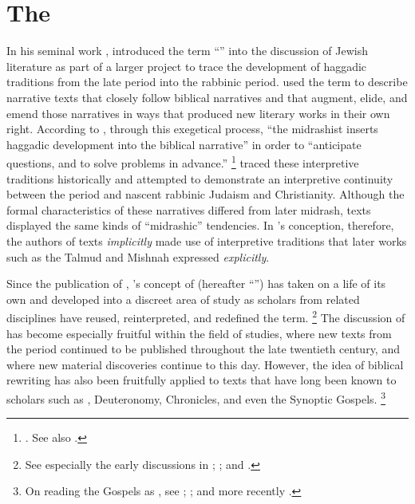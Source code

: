 
\chapter{The \rwb}
\label{chap:rwb}

In his seminal work , \Vermes introduced the term ``\rwB'' into the discussion of \secondtemple Jewish literature as part of a larger project to trace the development of haggadic traditions from the late \secondtemple period into the rabbinic period. \vermes used the term \rwB to describe narrative texts that closely follow biblical narratives and that augment, elide, and emend those narratives in ways that produced new literary works in their own right. According to \vermes, through this exegetical process, ``the midrashist inserts haggadic development into the biblical narrative'' in order to ``anticipate questions, and to solve problems in advance.''%
    \footnote{%
        \Cite[95]{vermes1961}. See also
        \cite{vermes_zsengeller2014}.}
\vermes traced these interpretive traditions historically and attempted to demonstrate an interpretive continuity between the \secondtemple period and nascent rabbinic Judaism and Christianity. Although the formal characteristics of these narratives differed from later midrash, \rwB texts displayed the same kinds of ``midrashic'' tendencies. In \vermes's conception, therefore, the authors of \rwB texts \emph{implicitly} made use of interpretive traditions that later works such as the Talmud and Mishnah expressed \emph{explicitly}. 

Since the publication of , \vermes's concept of \rwB (hereafter ``\rwb'') has taken on a life of its own and developed into a discreet area of study as scholars from related disciplines have reused, reinterpreted, and redefined the term.%
    \footnote{%
        See especially the early discussions in 
        \cite{alexander_carson-williamson1988}; 
        \cite{nickelsburg_stone1984}; and \cite{harrington_kraft-nickelsburg1986}.}
The discussion of \rwb has become especially fruitful within the field of \qumran studies, where new texts from the \secondtemple period continued to be published throughout the late twentieth century, and where new material discoveries continue to this day. However, the idea of biblical rewriting has also been fruitfully applied to texts that have long been known to scholars such as \jub, Deuteronomy, Chronicles, and even the Synoptic Gospels.%
    \footnote{%
        On reading the Gospels as \rwb, see 
        \cite{müller_back-kankaanniemi2012}; 
        \cite{malan_hts2014}; and more recently 
        \cite{allen_jsnt2018}.}

